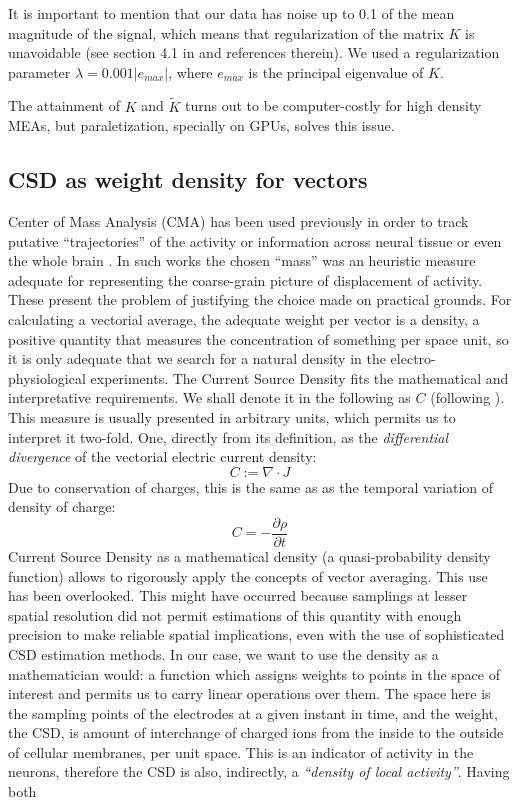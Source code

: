 \documentclass[11pt, letterpaper]{article}
\begin{document}
It is important to mention that our data has noise up to 0.1 of the mean magnitude of the
signal, which means that regularization of the matrix $K$ is unavoidable (see section 4.1 in \cite{Potworowski2011} and references therein). We used a regularization parameter $\lambda=0.001 |e_{max}|$, where $e_{max}$ is the principal eigenvalue of $K$. 

The attainment of $K$ and $\tilde{K}$ turns out to be computer-costly for high density MEAs, but paraletization, specially on GPUs, solves this issue.


\subsection{CSD as weight density for vectors}


Center of Mass Analysis (CMA) has been used previously in order to track putative  ``trajectories'' of the activity or information across neural tissue or even the whole brain \cite{Chao05, Chao07, Manjarrez07, Manjarrez09}. In such works the chosen ``mass'' was an heuristic measure adequate for representing the coarse-grain picture of displacement of activity. These present the problem of justifying the choice made on practical grounds. For calculating a vectorial average, the adequate weight per vector is a density, a positive quantity that measures the concentration of something per space unit, so it is only adequate that we search for a natural density in the electro-physiological experiments. The Current Source Density fits the mathematical and interpretative requirements. We shall denote it in the following as $C$ (following \cite{Potworowski2011}).  This measure is usually presented in arbitrary units, which permits us to interpret it two-fold. One, directly from its definition, as the \emph{differential divergence} of the vectorial electric current density:
\begin{equation}
  C:=\nabla \cdot J
\end{equation}
Due to conservation of charges, this is the same as as the temporal variation of density of charge:
\begin{equation}
  C=-\frac{\partial \rho}{\partial t}
\end{equation}
Current Source Density as a mathematical density (a quasi-probability density function)  allows  to rigorously apply the concepts of vector averaging. This use has been overlooked. This might have occurred because  samplings at lesser spatial resolution did not permit estimations of this quantity with enough precision to make reliable spatial implications, even with the use of sophisticated CSD estimation methods. In our case, we want to use the density as a mathematician would: a function which assigns weights to points in the space of interest and permits us to carry linear operations over them.  The space here is the sampling points of the electrodes at a given instant in time, and the weight, the CSD, is amount of interchange of charged ions from the inside to the outside of cellular membranes, per unit space.  This is an indicator of activity in the neurons, therefore the CSD is also, indirectly, a \emph{``density of local activity''}. Having both
\end{document}
